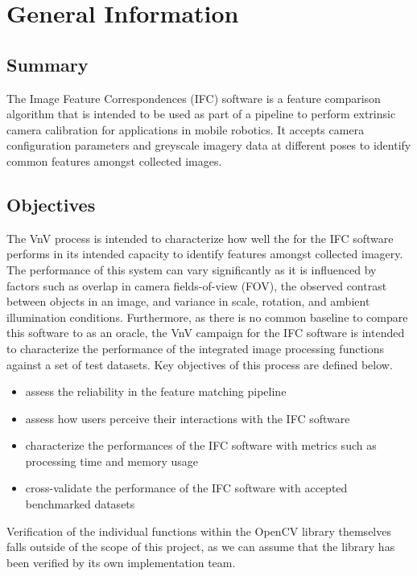 \documentclass[12pt, titlepage]{article}
\begin{document}
\section{General Information}

\subsection{Summary}
The Image Feature Correspondences (IFC) software is a feature comparison algorithm that is intended 
to be used as part of a pipeline to perform extrinsic camera calibration for 
applications in mobile robotics. It accepts camera configuration parameters and greyscale imagery data at 
different poses to identify common features amongst collected images. 

\subsection{Objectives}
The VnV process is intended to characterize how well the for the IFC software performs in its 
intended capacity to identify features amongst collected imagery. The performance of this system 
can vary significantly as it is influenced by factors such as overlap in camera fields-of-view (FOV),
the observed contrast between objects in an image, and variance in scale, rotation, and ambient 
illumination conditions. Furthermore, as there is no common baseline to compare this software to as 
an oracle, the VnV campaign for the IFC software is intended to characterize the performance of the 
integrated image processing functions against a set of test datasets. Key objectives of this process 
are defined below.

\begin{itemize}
  \item assess the reliability in the feature matching pipeline
  \item assess how users perceive their interactions with the IFC software 
  \item characterize the performances of the IFC software with metrics such as processing time and 
  memory usage
  \item cross-validate the performance of the IFC software with accepted benchmarked datasets
\end{itemize}
Verification of the individual functions within the OpenCV library themselves falls outside of the 
scope of this project, as we can assume that the library has been verified by its own 
implementation team. 
\\ \\
\end{document}
